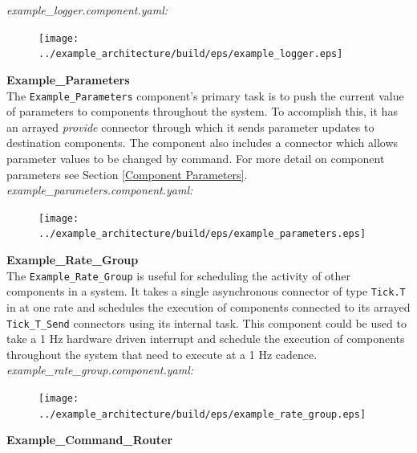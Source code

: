 \textit{example\_logger.component.yaml:}

\begin{figure}[H]
  \texttt{[image: ../example\_architecture/build/eps/example\_logger.eps]}
\end{figure}

\textbf{Example\_Parameters} \\

The \texttt{Example\_Parameters} component's primary task is to push the current value of parameters to components throughout the system. To accomplish this, it has an arrayed \textit{provide} connector through which it sends parameter updates to destination components. The component also includes a connector which allows parameter values to be changed by command. For more detail on component parameters see Section \ref{Component Parameters}. \\

\textit{example\_parameters.component.yaml:}

\begin{figure}[H]
  \texttt{[image: ../example\_architecture/build/eps/example\_parameters.eps]}
\end{figure}

\textbf{Example\_Rate\_Group} \\

The \texttt{Example\_Rate\_Group} is useful for scheduling the activity of other components in a system. It takes a single asynchronous connector of type \texttt{Tick.T} in at one rate and schedules the execution of components connected to its arrayed \texttt{Tick\_T\_Send} connectors using its internal task. This component could be used to take a 1 Hz hardware driven interrupt and schedule the execution of components throughout the system that need to execute at a 1 Hz cadence. \\

\textit{example\_rate\_group.component.yaml:}

\begin{figure}[H]
  \texttt{[image: ../example\_architecture/build/eps/example\_rate\_group.eps]}
\end{figure}

\textbf{Example\_Command\_Router} \\

